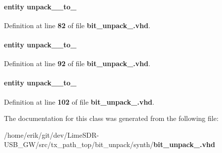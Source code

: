 \paragraph[{unpack\+\_\+64\+\_\+to\+\_\+48\+\_\+inst0}]{ {\bfseries \textcolor{keywordflow}{entity}\textcolor{vhdlchar}{ }\textcolor{vhdlchar}{unpack\+\_\+\_\+to\+\_}\textcolor{vhdlchar}{ }} \hspace{0.3cm}{\ttfamily [Instantiation]}}\label{classbit__unpack__64_1_1arch_a8c72a3ff1575538ca4dee879de18f997}


Definition at line {\bf 82} of file {\bf bit\+\_\+unpack\+\_.\+vhd}.

\paragraph[{unpack\+\_\+64\+\_\+to\+\_\+56\+\_\+inst1}]{ {\bfseries \textcolor{keywordflow}{entity}\textcolor{vhdlchar}{ }\textcolor{vhdlchar}{unpack\+\_\+\_\+to\+\_}\textcolor{vhdlchar}{ }} \hspace{0.3cm}{\ttfamily [Instantiation]}}\label{classbit__unpack__64_1_1arch_a342c0ca04a3a0bbe95e869b4158abcff}


Definition at line {\bf 92} of file {\bf bit\+\_\+unpack\+\_.\+vhd}.

\paragraph[{unpack\+\_\+64\+\_\+to\+\_\+64\+\_\+inst2}]{ {\bfseries \textcolor{keywordflow}{entity}\textcolor{vhdlchar}{ }\textcolor{vhdlchar}{unpack\+\_\+\_\+to\+\_}\textcolor{vhdlchar}{ }} \hspace{0.3cm}{\ttfamily [Instantiation]}}\label{classbit__unpack__64_1_1arch_a83120e524d21480d1f355798755f91c4}


Definition at line {\bf 102} of file {\bf bit\+\_\+unpack\+\_.\+vhd}.



The documentation for this class was generated from the following file\+:\begin{DoxyCompactItemize}
\item 
/home/erik/git/dev/\+Lime\+S\+D\+R-\/\+U\+S\+B\+\_\+\+G\+W/src/tx\+\_\+path\+\_\+top/bit\+\_\+unpack/synth/{\bf bit\+\_\+unpack\+\_.\+vhd}\end{DoxyCompactItemize}
